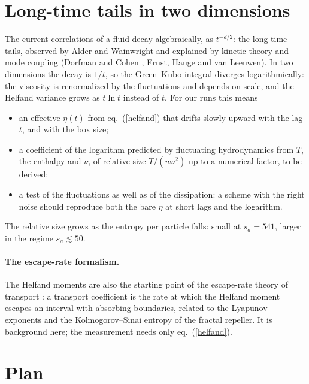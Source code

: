 \documentclass[11pt,aps,preprint,nofootinbib,superscriptaddress,tightenlines]{revtex4-2}
\def\Eq#1{eq.~(\ref{#1})}
\let\oldparagraph\paragraph
\renewcommand{\paragraph}{\par\bigskip\oldparagraph}
\begin{document}
\section{Long-time tails in two dimensions}
\label{sec:tails}

The current correlations of a fluid decay algebraically, as $t^{-d/2}$: the long-time tails, observed by Alder and Wainwright
and explained by kinetic theory and mode coupling (Dorfman and Cohen \cite{DorfmanCohen}, Ernst, Hauge and van Leeuwen).  In two
dimensions the decay is $1/t$, so the Green--Kubo integral diverges logarithmically: the viscosity is renormalized by the
fluctuations and depends on scale, and the Helfand variance grows as $t\ln t$ instead of $t$.  For our runs this means
\begin{itemize}
\item an effective $\eta(t)$ from \Eq{helfand} that drifts slowly upward with the lag $t$, and with the box size;
\item a coefficient of the logarithm predicted by fluctuating hydrodynamics from $T$, the enthalpy and $\nu$, of relative size
  $T/(w\nu^2)$ up to a numerical factor, to be derived;
\item a test of the fluctuations as well as of the dissipation: a scheme with the right noise should reproduce both the bare $\eta$ at
  short lags and the logarithm.
\end{itemize}
The relative size grows as the entropy per particle falls: small at $s_a=541$, larger in the regime $s_a\lesssim50$.

\paragraph{The escape-rate formalism.}  The Helfand moments are also the starting point of the escape-rate theory of transport
\cite{GaspardNicolis,DorfmanGaspard}: a transport coefficient is the rate at which the Helfand moment escapes an interval with
absorbing boundaries, related to the Lyapunov exponents and the Kolmogorov--Sinai entropy of the fractal repeller.  It is
background here; the measurement needs only \Eq{helfand}.

\section{Plan}
\label{sec:plan}
\end{document}
